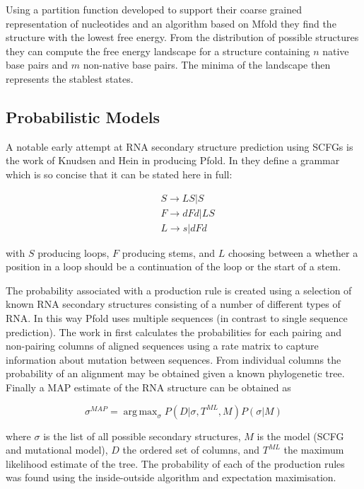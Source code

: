 \documentclass[journal]{IEEEtran}
\DeclareMathOperator*{\argmax}{arg\,max}
\begin{document}
Using a partition function developed to support their coarse grained representation of nucleotides and an algorithm based on Mfold \cite{mathews1999expanded} they find the structure with the lowest free energy. From the distribution of possible structures they can compute the free energy landscape for a structure containing $n$ native base pairs and $m$ non-native base pairs. The minima of the landscape then represents the stablest states.

\subsection{Probabilistic Models}
\label{subsec:probalistic-models}


A notable early attempt at RNA secondary structure prediction using SCFGs is the work of Knudsen and Hein \cite{knudsen1999rna, knudsen2003pfold} in producing Pfold. In \cite{knudsen1999rna} they define a grammar which is so concise that it can be stated here in full:

\begin{equation}
\begin{split}
	& S \rightarrow LS | S \\
	& F \rightarrow dFd | LS \\
	& L \rightarrow s | dFd 
\end{split}
\end{equation}

with $S$ producing loops, $F$ producing stems, and $L$ choosing between a whether a position in a loop should be a continuation of the loop or the start of a stem.

The probability associated with a production rule is created using a selection of known RNA secondary structures consisting of a number of different types of RNA. In this way Pfold uses multiple sequences (in contrast to single sequence prediction). The work in \cite{knudsen1999rna} first calculates the probabilities for each pairing and non-pairing columns of aligned sequences using a rate matrix to capture information about mutation between sequences. From individual columns the probability of an alignment may be obtained given a known phylogenetic tree. Finally a MAP estimate of the RNA structure can be obtained as

\begin{equation}
	\sigma^{MAP} = \argmax_{\sigma} P(D | \sigma, T^{ML}, M)P(\sigma | M)
\end{equation}

where $\sigma$ is the list of all possible secondary structures, $M$ is the model (SCFG and mutational model), $D$ the ordered set of columns, and $T^{ML}$ the maximum likelihood estimate of the tree. The probability of each of the production rules was found using the inside-outside algorithm and expectation maximisation.
\end{document}
